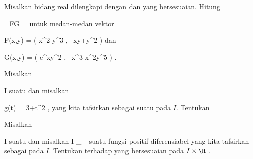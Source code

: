 \setcounter{section}{26}


{}
{

Misalkan bidang real dilengkapi dengan
dan
yang bersesuaian. Hitung

\mavergleichskette
{\vergleichskette
{ \nabla_FG
}
{ = }{
}
{  }{
}
{    }{
}
{   }{
}
}
{}{}{}
untuk medan-medan vektor

\mavergleichskettedisp
{\vergleichskette
{ F(x,y)
}
{ =} { \left(  x^2-y^3  , \,   xy+y^2                   \right)
}
{ } {
}
{ } {
}
{ } {
}
}
{}{}{}
dan

\mavergleichskettedisp
{\vergleichskette
{ G(x,y)
}
{ =} { \left( e^{xy^2}   , \,   x^3-x^2y^5                   \right)
}
{ } {
}
{ } {
}
{ } {
}
}
{}{}{.}

}
{} {}

{}
{

Misalkan

\mavergleichskette
{\vergleichskette
{ I
}
{ \subseteq }{ \R
}
{  }{
}
{    }{
}
{   }{
}
}
{}{}{}
suatu
dan misalkan

\mavergleichskettedisp
{\vergleichskette
{ g(t)
}
{ =} { 3+t^2
}
{ } {
}
{ } {
}
{ } {
}
}
{}{}{,}
yang kita tafsirkan sebagai suatu
pada $I$. Tentukan
 {} {}


}
{} {}

{}
{

Misalkan

\mavergleichskette
{\vergleichskette
{ I
}
{ \subseteq }{ \R
}
{  }{
}
{    }{
}
{   }{
}
}
{}{}{}
suatu
dan misalkan
 { I } {\R_+
} {}
suatu fungsi positif diferensiabel yang kita tafsirkan sebagai
pada $I$. Tentukan
terhadap
yang bersesuaian pada $I \times \R$
 {} {.}

}
{} {}

